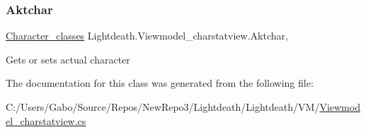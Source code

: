 \subsubsection{\texorpdfstring{Aktchar}{Aktchar}}
{\footnotesize\ttfamily \hyperlink{class_lightdeath_1_1_character__classes}{Character\+\_\+classes} Lightdeath.\+Viewmodel\+\_\+charstatview.\+Aktchar\hspace{0.3cm}{\ttfamily [get]}, {\ttfamily [set]}}



Gets or sets actual character 



The documentation for this class was generated from the following file\+:\begin{DoxyCompactItemize}
\item 
C\+:/\+Users/\+Gabo/\+Source/\+Repos/\+New\+Repo3/\+Lightdeath/\+Lightdeath/\+V\+M/\hyperlink{_viewmodel__charstatview_8cs}{Viewmodel\+\_\+charstatview.\+cs}\end{DoxyCompactItemize}
